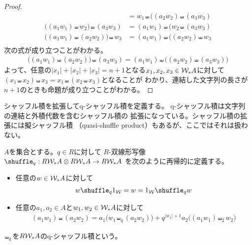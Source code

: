 {\begin{proof}
\begin{equation*}
\begin{split}
		&= w_1\shuffle\bigl((a_2w_2)\shuffle(a_3w_3) \\
		\bigl((a_1w_1)\shuffle w_2\bigr)\shuffle(a_3w_3)
		&= (a_1w_1)\shuffle\bigl(w_2\shuffle(a_3w_3) \\
		\bigl((a_1w_1)\shuffle(a_2w_2)\bigr)\shuffle w_3
		&= (a_1w_1)\shuffle\bigl((a_2w_2)\shuffle w_3 \\
	\end{split}\end{equation*}
	次の式が成り立つことがわかる。
	\begin{equation*}\begin{split}
		\bigl((a_1w_1)\shuffle(a_2w_2)\bigr)\shuffle(a_3w_3)
		= (a_1w_1)\shuffle\bigl((a_2w_2)\shuffle(a_3w_3)\bigr)
	\end{split}\end{equation*}
	よって、任意の$|x_1|+|x_2|+|x_3|=n+1$となる$x_1,x_2,x_3\in{\ensuremath{{\mathcal{W}}}}_*A$に対して
	$(x_1\shuffle x_2)\shuffle x_3=x_1\shuffle(x_2\shuffle x_3)$となることが
	わかり、連結した文字列の長さが$n+1$のときも命題が成り立つことがわかる。
	\end{proof}

	シャッフル積を拡張してq-シャッフル積を定義する\cite{Duchamp1997Non}。
	q-シャッフル積は文字列の連結と外積代数を含むシャッフル積の
	拡張になっている。シャッフル積の拡張には擬シャッフル積
	（quasi-shuffle product）もあるが、ここではそれは扱わない。

	\begin{definition}
	\label{def:q-シャッフル積} %
		$A$を集合とする。$q\in R$に対して
		$R$-双線形写像$\shuffle_q:R\W_*A\otimes R\W_*A\to R\W_*A$
		を次のように再帰的に定義する。
		\begin{itemize}\setlength{\itemsep}{-1mm} %
			\item 任意の$w\in {\ensuremath{{\mathcal{W}}}}_*A$に対して
			\begin{equation*}\begin{split}
				w\shuffle_q1_\W = w = 1_\W\shuffle_qw
			\end{split}\end{equation*}
			\item 任意の$a_1,a_2\in A$と$w_1,w_2\in{\ensuremath{{\mathcal{W}}}}_*A$に対して
			\begin{equation*}\begin{split}
				(a_1w_1)\shuffle (a_2w_2)
				= a_1\bigl(w_1\shuffle_q(a_2w_2)\bigr)
				+ q^{|w_1|+1} a_2\bigl((a_1w_1)\shuffle_2w_2\bigr)
			\end{split}\end{equation*}
		\end{itemize} %
		$\shuffle_q$を$R{{\mathcal{W}}}_*A$のq-シャッフル積という。
	\end{definition} %

}
